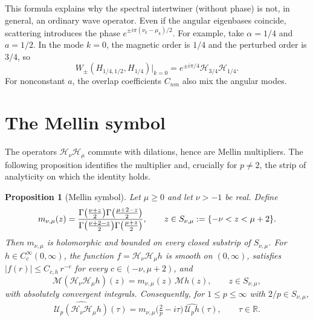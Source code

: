\documentclass[11pt,a4paper,reqno,backref=page]{amsart}
\newcommand{\R}{\mathbb R}
\newcommand{\HH}{\mathcal H}                 %
\newcommand{\Mell}{\mathcal M}               %
\let\Re\relax\DeclareMathOperator{\Re}{Re}
\newcommand{\coloneq}{:=}
\numberwithin{equation}{section}
\newtheorem{proposition}[theorem]{Proposition}
\theoremstyle{definition}
\theoremstyle{remark}
\begin{document}
This formula explains why the spectral intertwiner (without
phase) is not, in general, an ordinary wave operator. Even if the
angular eigenbases coincide, scattering introduces the phase
$e^{\pm i\pi(\nu_k-\mu_k)/2}$. For example, take
$\alpha=1/4$ and $a=1/2$. In the mode $k=0$, the magnetic
order is $1/4$ and the perturbed order is $3/4$, so
\begin{equation*}
  W_\pm(H_{1/4,1/2},H_{1/4})\big|_{k=0}
  =e^{\pm i\pi/4}\HH_{3/4}\HH_{1/4}.
\end{equation*}
For nonconstant $a$, the overlap coefficients $C_{nm}$ also
mix the angular modes. 


\section{The Mellin symbol}\label{sec:mellin}


The operators $\HH_\nu\HH_\mu$ commute with dilations, hence are
Mellin multipliers. The following proposition identifies the
multiplier and, crucially for $p\ne2$, the strip of analyticity
on which the identity holds.

\begin{proposition}[Mellin symbol]\label{prop:symbol}
Let $\mu\ge0$ and let $\nu>-1$ be real. Define
\begin{equation}\label{eq:symbol}
  m_{\nu,\mu}(z)
  =\frac{\Gamma\bigl(\frac{\nu+z}{2}\bigr)
    \Gamma\bigl(\frac{\mu+2-z}{2}\bigr)}
  {\Gamma\bigl(\frac{\nu+2-z}{2}\bigr)
    \Gamma\bigl(\frac{\mu+z}{2}\bigr)},
  \qquad z\in S_{\nu,\mu}\coloneq\{-\nu<\Re z<\mu+2\}.
\end{equation}
Then $m_{\nu,\mu}$ is holomorphic and bounded on every closed
substrip of $S_{\nu,\mu}$. For $h\in C_c^\infty(0,\infty)$, the
function $f=\HH_\nu\HH_\mu h$ is smooth on $(0,\infty)$,
satisfies $|f(r)|\le C_{c,h}\,r^{-c}$ for every
$c\in(-\nu,\mu+2)$, and
\begin{equation}\label{eq:symbol-id}
  \Mell(\HH_\nu\HH_\mu h)(z)=m_{\nu,\mu}(z)\,\Mell h(z),\qquad
  z\in S_{\nu,\mu},
\end{equation}
with absolutely convergent integrals. Consequently, for $1\le
p\le\infty$ with $2/p\in S_{\nu,\mu}$,
\begin{equation}\label{eq:symbol-fourier}
  \widehat{\mathcal U_p(\HH_\nu\HH_\mu h)}(\tau)
  =m_{\nu,\mu}\bigl(\tfrac2p-i\tau\bigr)\,\widehat{\mathcal
  U_ph}(\tau),
  \qquad\tau\in\R.
\end{equation}
\end{proposition}
\end{document}
